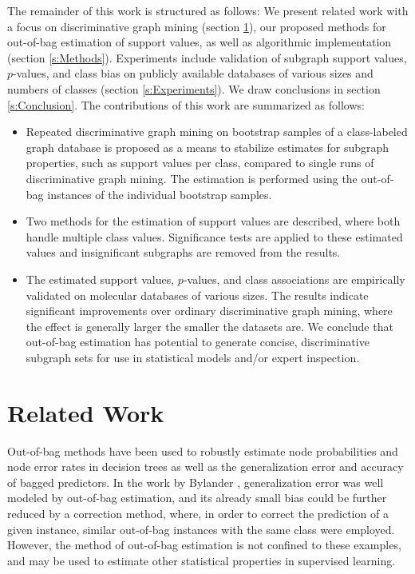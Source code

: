\documentclass{sig-alternate}
\begin{document}
The remainder of this work is structured as follows: We present related work
with a focus on discriminative graph mining (section \ref{s:relatedWork}), our
proposed methods for out-of-bag estimation of support values, as
well as algorithmic implementation (section \ref{s:Methods}).
Experiments include validation of subgraph support
values, $p$-values, and class bias on publicly available databases of
various sizes and numbers of classes (section \ref{s:Experiments}).
We draw conclusions in section \ref{s:Conclusion}.
The contributions of this work are summarized as follows:
\begin{itemize}
  \item Repeated discriminative graph mining on bootstrap samples of a
    class-labeled graph database is proposed as a means to stabilize estimates
    for subgraph properties, such as support values per class, compared to
    single runs of discriminative graph mining. The estimation is performed
    using the out-of-bag instances of the individual bootstrap samples.
  \item Two methods for the estimation of support values are described, where both
    handle multiple class values. Significance tests are applied to these
    estimated values and insignificant subgraphs are removed from the results.  
  \item The estimated support values, $p$-values, and class
    associations are empirically validated on molecular databases of various
    sizes.  The results indicate significant improvements over 
    ordinary discriminative graph mining, where the effect is generally larger the
    smaller the datasets are.  We conclude that out-of-bag estimation has 
    potential to generate concise, discriminative subgraph sets for
    use in statistical models and/or expert inspection.
\end{itemize}


\section{Related Work}
\label{s:relatedWork}

Out-of-bag methods have been used to robustly estimate node probabilities and
node error rates in decision trees \cite{breiman96oob} as well as the
generalization error and accuracy of bagged predictors. In the work by Bylander
\cite{bylander02estimating}, generalization error was well modeled by
out-of-bag estimation, and its already small bias could be further reduced by a
correction method, where, in order to correct the prediction of a given
instance, similar out-of-bag instances with the same class were
employed. However, the method of out-of-bag estimation is not confined to these
examples, and may be used to estimate other statistical properties in
supervised learning.
\end{document}
